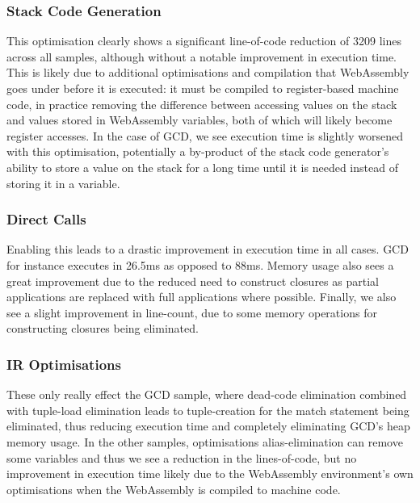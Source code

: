 \subsubsection{Stack Code Generation}
This optimisation clearly shows a significant line-of-code reduction of 3209 lines across all samples, although without a notable improvement in execution time. This is likely due to additional optimisations and compilation that WebAssembly goes under before it is executed: it must be compiled to register-based machine code, in practice removing the difference between accessing values on the stack and values stored in WebAssembly variables, both of which will likely become register accesses. In the case of GCD, we see execution time is slightly worsened with this optimisation, potentially a by-product of the stack code generator's ability to store a value on the stack for a long time until it is needed instead of storing it in a variable.

\subsubsection{Direct Calls}
Enabling this leads to a drastic improvement in execution time in all cases. GCD for instance executes in 26.5ms as opposed to 88ms. Memory usage also sees a great improvement due to the reduced need to construct closures as partial applications are replaced with full applications where possible. Finally, we also see a slight improvement in line-count, due to some memory operations for constructing closures being eliminated.

\subsubsection{IR Optimisations}
These only really effect the GCD sample, where dead-code elimination combined with tuple-load elimination leads to tuple-creation for the match statement being eliminated, thus reducing execution time and completely eliminating GCD's heap memory usage. In the other samples, optimisations alias-elimination can remove some variables and thus we see a reduction in the lines-of-code, but no improvement in execution time likely due to the WebAssembly environment's own optimisations when the WebAssembly is compiled to machine code.

